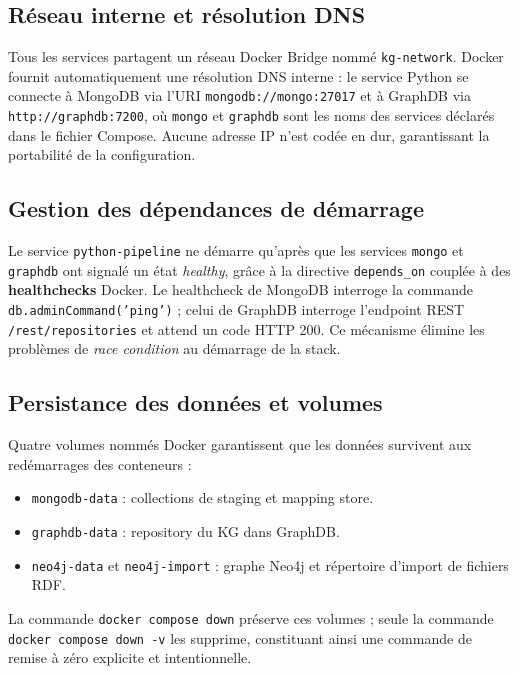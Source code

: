 \subsection{Réseau interne et résolution DNS}

Tous les services partagent un réseau Docker Bridge nommé
\texttt{kg-network}.
Docker fournit automatiquement une résolution DNS interne : le service Python
se connecte à MongoDB via l'URI \texttt{mongodb://mongo:27017} et à GraphDB
via \texttt{http://graphdb:7200}, où \texttt{mongo} et \texttt{graphdb}
sont les noms des services déclarés dans le fichier Compose.
Aucune adresse IP n'est codée en dur, garantissant la portabilité de la
configuration.

\subsection{Gestion des dépendances de démarrage}

Le service \texttt{python-pipeline} ne démarre qu'après que les services
\texttt{mongo} et \texttt{graphdb} ont signalé un état \textit{healthy},
grâce à la directive \texttt{depends\_on} couplée à des
\textbf{healthchecks} Docker.
Le healthcheck de MongoDB interroge la commande \texttt{db.adminCommand('ping')} ;
celui de GraphDB interroge l'endpoint REST \texttt{/rest/repositories} et
attend un code HTTP 200.
Ce mécanisme élimine les problèmes de \textit{race condition} au démarrage
de la stack.

\subsection{Persistance des données et volumes}

Quatre volumes nommés Docker garantissent que les données survivent aux
redémarrages des conteneurs :
\begin{itemize}
    \item \texttt{mongodb-data} : collections de staging et mapping store.
    \item \texttt{graphdb-data} : repository du KG dans GraphDB.
    \item \texttt{neo4j-data} et \texttt{neo4j-import} : graphe Neo4j et
          répertoire d'import de fichiers RDF.
\end{itemize}
La commande \texttt{docker compose down} préserve ces volumes ;
seule la commande \texttt{docker compose down -v} les supprime,
constituant ainsi une commande de remise à zéro explicite et intentionnelle.

